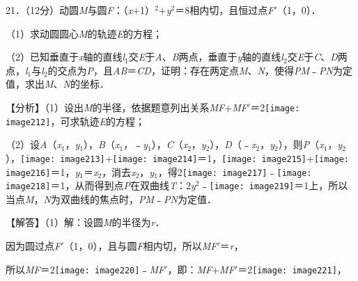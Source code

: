 \documentclass[a4paper,11pt,UTF8,twoside]{ctexart} %
\begin{document}
21．（12分）动圆\textit{M}与圆\textit{F}：（\textit{x}+1）${}^{2}$+\textit{y}${}^{2}$＝8相内切，且恒过点\textit{F}$\mathrm{\prime}$（1，0）．

（1）求动圆圆心\textit{M}的轨迹\textit{E}的方程；

（2）已知垂直于\textit{x}轴的直线\textit{l}${}_{1}$交\textit{E}于\textit{A}、\textit{B}两点，垂直于\textit{y}轴的直线\textit{l}${}_{2}$交\textit{E}于\textit{C}、\textit{D}两点，\textit{l}${}_{1}$与\textit{l}${}_{2}$的交点为\textit{P}，且{\textbar}\textit{AB}{\textbar}＝{\textbar}\textit{CD}{\textbar}，证明：存在两定点\textit{M}、\textit{N}，使得{\textbar}{\textbar}\textit{PM}{\textbar}﹣{\textbar}\textit{PN}{\textbar}{\textbar}为定值，求出\textit{M}、\textit{N}的坐标．

【分析】（1）设出\textit{M}的半径，依据题意列出关系\textit{MF}+\textit{MF}$\mathrm{\prime}$＝2\texttt{[image: image212]}，可求轨迹\textit{E}的方程；

（2）设\textit{A}（\textit{x}${}_{1}$，\textit{y}${}_{1}$），\textit{B}（\textit{x}${}_{1}$，﹣\textit{y}${}_{1}$），\textit{C}（\textit{x}${}_{2}$，\textit{y}${}_{2}$），\textit{D}（﹣\textit{x}${}_{2}$，\textit{y}${}_{2}$），则\textit{P}（\textit{x}${}_{1}$，\textit{y}${}_{2}$），\texttt{[image: image213]}+\texttt{[image: image214]}＝1，\texttt{[image: image215]}+\texttt{[image: image216]}＝1，{\textbar}\textit{y}${}_{1}${\textbar}＝{\textbar}\textit{x}${}_{2}${\textbar}，消去\textit{x}${}_{2}$，\textit{y}${}_{1}$，得2\texttt{[image: image217]}﹣\texttt{[image: image218]}＝1，从而得到点\textit{P}在双曲线\textit{T}：2\textit{y}${}^{2}$﹣\texttt{[image: image219]}＝1上，所以当点\textit{M}，\textit{N}为双曲线的焦点时，{\textbar}{\textbar}\textit{PM}{\textbar}﹣{\textbar}\textit{PN}{\textbar}{\textbar}为定值．

【解答】（1）解：设圆\textit{M}的半径为\textit{r}．

因为圆过点\textit{F}$\mathrm{\prime}$（1，0），且与圆\textit{F}相内切，所以\textit{MF}$\mathrm{\prime}$＝\textit{r}，

所以\textit{MF}＝2\texttt{[image: image220]}﹣\textit{MF}$\mathrm{\prime}$，即：\textit{MF}+\textit{MF}$\mathrm{\prime}$＝2\texttt{[image: image221]}，
\end{document}
